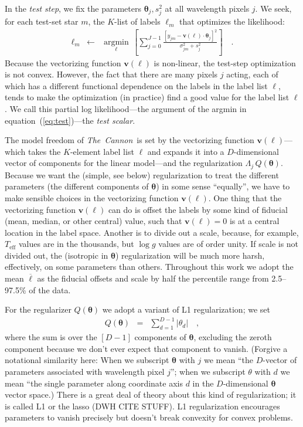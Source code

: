 \documentclass[12pt,preprint]{aastex}
\newcommand{\project}[1]{\textsl{#1}}
\newcommand{\TheCannon}{\project{The~Cannon}}
\newcommand{\logg}{\log g}
\newcommand{\Teff}{T_{\mathrm{eff}}}
\newcommand{\Dvector}[1]{\boldsymbol{#1}}
\newcommand{\vectheta}{\Dvector{\theta}}
\newcommand{\vecv}{\Dvector{v}}
\newcommand{\argmin}[1]{\underset{#1}{\operatorname{argmin}}\,}
\begin{document}
In the \emph{test step}, we fix the parameters $\vectheta_j,s^2_j$ at all
wavelength pixels $j$.
We seek, for each test-set star $m$, the $K$-list of labels $\ell_m$
that optimizes the likelihood:
\begin{eqnarray}\label{eq:test}
  \ell_m &\leftarrow& \argmin{\ell}\left[
    \sum_{j=0}^{J-1} \frac{[y_{jm}-\vecv(\ell)\cdot\vectheta_j]^2}{\sigma^2_{jm}+s^2_j}
    \right]
  \quad .
\end{eqnarray}
Because the vectorizing function $\vecv(\ell)$ is non-linear, the
test-step optimization is not convex.
However, the fact that there are many pixels $j$ acting, each of which
has a different functional dependence on the labels in the label list
$\ell$, tends to make the optimization (in practice) find a good value
for the label list $\ell$.
We call this partial log likelihood---the argument of the
argmin in equation~(\ref{eq:test})---the \emph{test scalar}.

The model freedom of \TheCannon\ is set by the vectorizing function
$\vecv(\ell)$---which takes the $K$-element label list $\ell$ and expands
it into a $D$-dimensional vector of components for the linear
model---and the regularization $\Lambda_j\,Q(\vectheta)$.
Because we want the (simple, see below) regularization to treat the
different parameters (the different components of $\vectheta$) in some
sense ``equally'', we have to make sensible choices in the vectorizing
function $\vecv(\ell)$.
One thing that the vectorizing function $\vecv(\ell)$ can do is offset the
labels by some kind of fiducial (mean, median, or other central)
value, such that $\vecv(\ell)=0$ is at a central location in the label
space.
Another is to divide out a scale, because, for example, $\Teff$ values
are in the thousands, but $\logg$ values are of order unity.
If scale is not divided out, the (isotropic in $\vectheta$)
regularization will be much more harsh, effectively, on some
parameters than others.  Throughout this work we adopt the mean $\overline\ell$ as the fiducial offsets and scale by half the percentile range from 2.5--97.5\% of the data.



For the regularizer $Q(\vectheta)$ we adopt a variant of L1
regularization; we set
\begin{eqnarray}
  Q(\vectheta) &=& \sum_{d=1}^{D-1} |\theta_d|
  \quad,
\end{eqnarray}
where the sum is over the $[D-1]$ components of $\vectheta$, excluding
the zeroth component because we don't ever expect that component to
vanish.
(Forgive a notational similarity here: When we subscript $\vectheta$ with
$j$ we mean ``the $D$-vector of parameters associated with wavelength
pixel $j$''; when we subscript $\theta$ with $d$ we mean ``the single
parameter along coordinate axis $d$ in the $D$-dimensional $\vectheta$
vector space.)
There is a great deal of theory about this kind of regularization; it
is called L1 or the lasso (DWH CITE STUFF).
L1 regularization encourages parameters to vanish precisely but
doesn't break convexity for convex problems.
\end{document}
